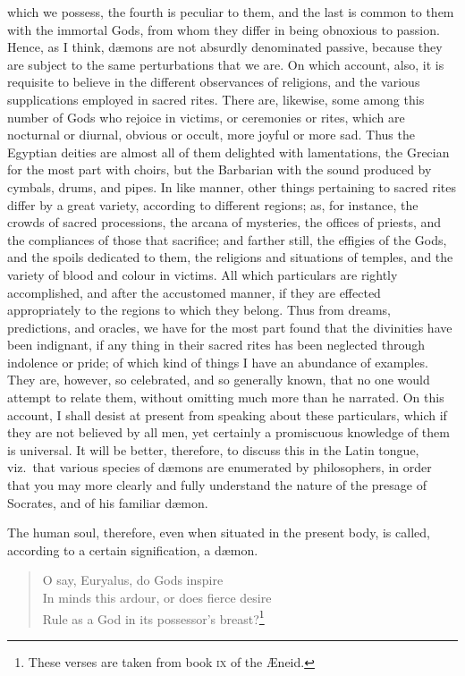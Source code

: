 \documentclass[12pt]{article}
\begin{document}
which we possess, the fourth is peculiar to them, and the last is common to
them with the immortal Gods, from whom they differ in being obnoxious to
passion. Hence, as I think, d{\ae}mons are not absurdly denominated passive,
because they are subject to the same perturbations that we are. On which
account, also, it is requisite to believe in the different observances of
religions, and the various supplications employed in sacred rites. There are,
likewise, some among this number of Gods who rejoice in victims, or ceremonies
or rites, which are nocturnal or diurnal, obvious or occult, more joyful or
more sad. Thus the Egyptian deities are almost all of them delighted with
lamentations, the Grecian for the most part with choirs, but the Barbarian with
the sound produced by cymbals, drums, and pipes. In like manner, other things
pertaining to sacred rites differ by a great variety, according to different
regions; as, for instance, the crowds of sacred processions, the arcana of
mysteries, the offices of priests, and the compliances of those that sacrifice;
and farther still, the effigies of the Gods, and the spoils dedicated to them,
the religions and situations of temples, and the variety of blood and colour in
victims. All which particulars are rightly accomplished, and after the
accustomed manner, if they are effected appropriately to the regions to which
they belong. Thus from dreams, predictions, and oracles, we have for the most
part found that the divinities have been indignant, if any thing in their
sacred rites has been neglected through indolence or pride; of which kind of
things I have an abundance of examples. They are, however, so celebrated, and
so generally known, that no one would attempt to relate them, without omitting
much more than he narrated.  On this account, I shall desist at present from
speaking about these particulars, which if they are not believed by all men,
yet certainly a promiscuous knowledge of them is universal. It will be better,
therefore, to discuss this in the Latin tongue, viz.~that various species of
d{\ae}mons are enumerated by philosophers, in order that you may more clearly
and fully understand the nature of the presage of Socrates, and of his familiar
d{\ae}mon.

The human soul, therefore, even when situated in the present body, is called,
according to a certain signification, a d{\ae}mon.

\begin{verse}
O say, Euryalus, do Gods inspire\\
In minds this ardour, or does fierce desire\\
Rule as a God in its possessor's breast?\footnote{These verses are taken from
book \textsc{ix} of the {\AE}neid.}
\end{verse}
\end{document}
